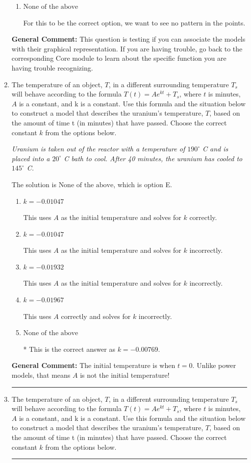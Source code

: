 \documentclass{extbook}[14pt]
\newcommand{\litem}[1]{\item #1

\rule{\textwidth}{0.4pt}}
\begin{document}
\begin{enumerate}
{\begin{enumerate}[label=\Alph*.]
For this to be the correct option, we need to see a mostly straight line of points.
\item \( \text{None of the above} \)

For this to be the correct option, we want to see no pattern in the points.
\end{enumerate}

\textbf{General Comment:} This question is testing if you can associate the models with their graphical representation. If you are having trouble, go back to the corresponding Core module to learn about the specific function you are having trouble recognizing.
}
\litem{
The temperature of an object, $T$, in a different surrounding temperature $T_s$ will behave according to the formula $T(t) = Ae^{kt} + T_s$, where $t$ is minutes, $A$ is a constant, and k is a constant. Use this formula and the situation below to construct a model that describes the uranium's temperature, $T$, based on the amount of time t (in minutes) that have passed. Choose the correct constant $k$ from the options below.

\begin{center}
    \textit{ Uranium is taken out of the reactor with a temperature of $190^{\circ}$ C and is placed into a $20^{\circ}$ C bath to cool. After 40 minutes, the uranium has cooled to $145^{\circ}$ C. }
\end{center}


The solution is \( \text{None of the above} \), which is option E.\begin{enumerate}[label=\Alph*.]
\item \( k = -0.01047 \)

This uses $A$ as the initial temperature and solves for $k$ correctly.
\item \( k = -0.01047 \)

This uses $A$ as the initial temperature and solves for $k$ incorrectly.
\item \( k = -0.01932 \)

This uses $A$ as the initial temperature and solves for $k$ incorrectly.
\item \( k = -0.01967 \)

This uses $A$ correctly and solves for $k$ incorrectly.
\item \( \text{None of the above} \)

* This is the correct answer as $k = -0.00769$.
\end{enumerate}

\textbf{General Comment:} The initial temperature is when $t = 0$. Unlike power models, that means $A$ is not the initial temperature!
}
\litem{
The temperature of an object, $T$, in a different surrounding temperature $T_s$ will behave according to the formula $T(t) = Ae^{kt} + T_s$, where $t$ is minutes, $A$ is a constant, and k is a constant. Use this formula and the situation below to construct a model that describes the uranium's temperature, $T$, based on the amount of time t (in minutes) that have passed. Choose the correct constant $k$ from the options below.

}
\end{enumerate}
\end{document}
